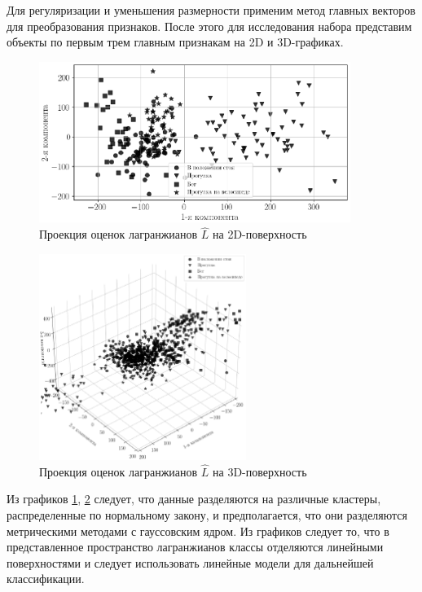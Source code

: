 \documentclass[a4paper, 12pt]{article}
\begin{document}
Для регуляризации и уменьшения размерности применим метод главных векторов для преобразования признаков. После этого для исследования набора представим объекты по первым трем главным признакам на 2D и 3D-графиках.

\begin{figure}[!htbp]
 \centering
 \includegraphics[width=0.9\textwidth]{Data.eps}
 \caption{Проекция оценок лагранжианов $\hat{L}$ на 2D-поверхность}
 \label{fig: 2D}
\end{figure}

\begin{figure}[!htbp]
 \centering
 \includegraphics[width=0.6\textwidth]{Data_3D.eps}
 \caption{Проекция оценок лагранжианов $\hat{L}$ на 3D-поверхность}
 \label{fig: 3D}
\end{figure}

Из графиков \ref{fig: 2D}, \ref{fig: 3D} следует, что данные разделяются на различные кластеры, распределенные по нормальному закону, и предполагается, что они разделяются метрическими методами с гауссовским ядром. Из графиков следует то, что в представленное пространство лагранжианов классы отделяются линейными поверхностями и следует использовать линейные модели для дальнейшей классификации.
\newpage
\end{document}
